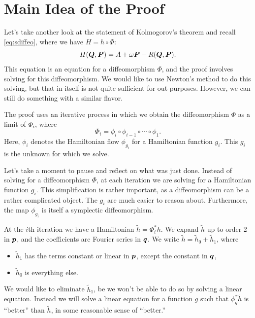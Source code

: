 \documentclass[twoside,letterpaper,10pt]{article}
\numberwithin{equation}{section}
\begin{document}
\section{Main Idea of the Proof}
\label{sec:main-idea-proof}

Let's take another look at the statement of Kolmogorov's theorem and recall
\cref{eq:sdiffeo}, where we have $H = h \circ \Phi$:
\begin{equation*}
  H(\bm{Q}, \bm{P}) = A + \omega \bm{P} + R(\bm{Q}, \bm{P}).
\end{equation*}
This equation is an equation for a diffeomorphism $\Phi$, and the proof involves
solving for this diffeomorphism.
We would like to use Newton's method to do this solving, but that in itself is
not quite sufficient for out purposes.
However, we can still do something with a similar flavor.

The proof uses an iterative process in which we obtain the diffeomorphism $\Phi$
as a limit of $\Phi_i$, where
\begin{equation*}
  \Phi_i = \phi_i \circ \phi_{i - 1} \circ \cdots \circ \phi_1.
\end{equation*}
Here, $\phi_i$ denotes the Hamiltonian flow $\phi_{g_i}$ for a Hamiltonian
function $g_i$.
This $g_i$ is the unknown for which we solve.

Let's take a moment to pause and reflect on what was just done.
Instead of solving for a diffeomorphism $\Phi$, at each iteration we are solving
for a Hamiltonian function $g_i$.
This simplification is rather important, as a diffeomorphism can be a rather
complicated object.
The $g_i$ are much easier to reason about.
Furthermore, the map $\phi_{g_i}$ is itself a symplectic diffeomorphism.

At the $i$th iteration we have a Hamiltonian $\tilde{h} = \Phi_i^* h$.
We expand $\tilde{h}$ up to order $2$ in $\bm{p}$, and the coefficients are
Fourier series in $\bm{q}$.
We write $\tilde{h} = \tilde{h}_0 + \tilde{h}_1$, where
\begin{itemize}
\item $\tilde{h}_1$ has the terms constant or linear in $\bm{p}$, except the
  constant in $\bm{q}$,
\item $\tilde{h}_0$ is everything else.
\end{itemize}
We would like to eliminate $\tilde{h}_1$, be we won't be able to do so by
solving a linear equation.
Instead we will solve a linear equation for a function $g$ such that
$\phi_g^*\tilde{h}$ is ``better'' than $\tilde{h}$, in some reasonable sense of
``better.''
\end{document}
